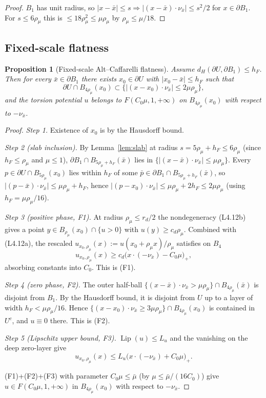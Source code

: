 \documentclass[11pt]{article}
\newtheorem{proposition}[theorem]{Proposition}
\theoremstyle{definition}
\theoremstyle{remark}
\newcommand{\BB}{B_1}
\newcommand{\dH}{d_H}
\DeclareMathOperator{\Lip}{Lip}
\begin{document}
\begin{proof}
$\BB$ has unit radius, so $|x-\bar x|\le s\Rightarrow
|(x-\bar x)\cdot\nu_{\bar x}|\le s^2/2$ for $x\in\partial\BB$. For
$s\le6\rho_\mu$ this is $\le18\rho_\mu^2\le\mu\rho_\mu$ by
$\rho_\mu\le\mu/18$.
\end{proof}

\subsection{Fixed-scale flatness}

\begin{proposition}[Fixed-scale Alt--Caffarelli flatness]\label{prop:flat}
Assume $\dH(\partial U,\partial\BB)\le h_F$. Then for every
$\bar x\in\partial\BB$ there exists $x_0\in\partial U$ with
$|x_0-\bar x|\le h_F$ such that
\[
\partial U\cap B_{4\rho_\mu}(x_0)
\subset\bigl\{|(x-x_0)\cdot\nu_{\bar x}|\le 2\mu\rho_\mu\bigr\},
\]
and the torsion potential $u$ belongs to $F(C_0\mu,1,+\infty)$ on
$B_{4\rho_\mu}(x_0)$ with respect to $-\nu_{\bar x}$.
\end{proposition}

\begin{proof}
\emph{Step 1.} Existence of $x_0$ is by the Hausdorff bound.

\emph{Step 2 (slab inclusion).} By Lemma~\ref{lem:slab} at radius
$s=5\rho_\mu+h_F\le6\rho_\mu$ (since $h_F\le\rho_\mu$ and $\mu\le1$),
$\partial\BB\cap B_{5\rho_\mu+h_F}(\bar x)$ lies in
$\{|(x-\bar x)\cdot\nu_{\bar x}|\le\mu\rho_\mu\}$. Every
$p\in\partial U\cap B_{5\rho_\mu}(x_0)$ lies within $h_F$ of some
$\bar p\in\partial\BB\cap B_{5\rho_\mu+h_F}(\bar x)$, so
$|(p-\bar x)\cdot\nu_{\bar x}|\le\mu\rho_\mu+h_F$, hence
$|(p-x_0)\cdot\nu_{\bar x}|\le\mu\rho_\mu+2h_F\le 2\mu\rho_\mu$
(using $h_F=\mu\rho_\mu/16$).

\emph{Step 3 (positive phase, F1).} At radius $\rho_\mu\le r_d/2$ the
nondegeneracy (L4.12b) gives a point $y\in B_{\rho_\mu}(x_0)\cap\{u>0\}$
with $u(y)\ge c_d\rho_\mu$. Combined with (L4.12a), the rescaled
$u_{x_0,\rho_\mu}(x):=u(x_0+\rho_\mu x)/\rho_\mu$ satisfies on $B_4$
\[
u_{x_0,\rho_\mu}(x)\ge c_d\bigl(x\cdot(-\nu_{\bar x})-C_0\mu\bigr)_+,
\]
absorbing constants into $C_0$. This is (F1).

\emph{Step 4 (zero phase, F2).} The outer half-ball
$\{(x-\bar x)\cdot\nu_{\bar x}>\mu\rho_\mu\}\cap B_{4\rho_\mu}(\bar x)$ is
disjoint from $\BB$. By the Hausdorff bound, it is disjoint from $U$ up to
a layer of width $h_F<\mu\rho_\mu/16$. Hence
$\{(x-x_0)\cdot\nu_{\bar x}\ge3\mu\rho_\mu\}\cap B_{4\rho_\mu}(x_0)$ is
contained in $U^c$, and $u\equiv0$ there. This is (F2).

\emph{Step 5 (Lipschitz upper bound, F3).}
$\Lip(u)\le L_u$ and the vanishing on the deep zero-layer give
\[
u_{x_0,\rho_\mu}(x)\le L_u\bigl(x\cdot(-\nu_{\bar x})+C_0\mu\bigr)_+.
\]

(F1)+(F2)+(F3) with parameter $C_0\mu\le\bar\mu$ (by
$\mu\le\bar\mu/(16C_0)$) give $u\in F(C_0\mu,1,+\infty)$ in
$B_{4\rho_\mu}(x_0)$ with respect to $-\nu_{\bar x}$.
\end{proof}
\end{document}
